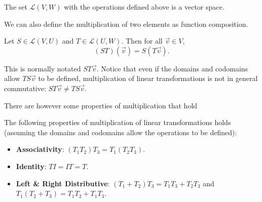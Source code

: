 \begin{theorem}
	The set $\mathcal{L}(V,W)$ with the operations defined above is a vector space.
\end{theorem}

We can also define the multiplication of two elements as function composition.
\begin{definition}
	Let $S \in \mathcal{L}(V,U)$ and $T \in \mathcal{L}(U,W)$.
	Then for all $\vec{v} \in V$,
	\begin{equation*}
		(ST)(\vec{v}) = S(T\vec{v}).
	\end{equation*}
\end{definition}
This is normally notated $ST\vec{v}$.
Notice that even if the domains and codomains allow $TS\vec{v}$ to be defined, multiplication of linear transformations is not in general commutative: $ST\vec{v} \neq TS\vec{v}$.

There are however some properties of multiplication that hold
\begin{theorem}
	The following properties of multiplication of linear transformations holds (assuming the domains and codomains allow the operations to be defined):
	\begin{itemize}
		\item \textbf{Associativity}: $(T_1T_2)T_3 = T_1(T_2T_3)$.
		\item \textbf{Identity}: $TI = IT = T$.
		\item \textbf{Left \& Right Distributive}: $(T_1 + T_2)T_3 = T_1T_3 + T_2T_3$ and $T_1(T_2 + T_3) = T_1T_2 + T_1T_3$.
	\end{itemize}
\end{theorem}